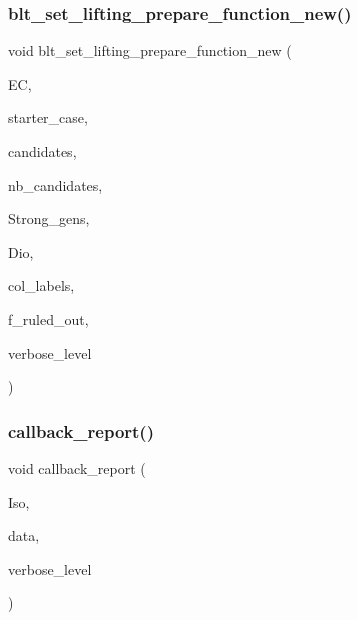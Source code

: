 \subsubsection{\texorpdfstring{blt\+\_\+set\+\_\+lifting\+\_\+prepare\+\_\+function\+\_\+new()}{blt\_set\_lifting\_prepare\_function\_new()}}
{\footnotesize\ttfamily void blt\+\_\+set\+\_\+lifting\+\_\+prepare\+\_\+function\+\_\+new (\begin{DoxyParamCaption}\item[{\mbox{\hyperlink{classexact__cover}{exact\+\_\+cover}} $\ast$}]{EC,  }\item[{\mbox{\hyperlink{galois_8h_a09fddde158a3a20bd2dcadb609de11dc}{I\+NT}}}]{starter\+\_\+case,  }\item[{\mbox{\hyperlink{galois_8h_a09fddde158a3a20bd2dcadb609de11dc}{I\+NT}} $\ast$}]{candidates,  }\item[{\mbox{\hyperlink{galois_8h_a09fddde158a3a20bd2dcadb609de11dc}{I\+NT}}}]{nb\+\_\+candidates,  }\item[{\mbox{\hyperlink{classstrong__generators}{strong\+\_\+generators}} $\ast$}]{Strong\+\_\+gens,  }\item[{\mbox{\hyperlink{classdiophant}{diophant}} $\ast$\&}]{Dio,  }\item[{\mbox{\hyperlink{galois_8h_a09fddde158a3a20bd2dcadb609de11dc}{I\+NT}} $\ast$\&}]{col\+\_\+labels,  }\item[{\mbox{\hyperlink{galois_8h_a09fddde158a3a20bd2dcadb609de11dc}{I\+NT}} \&}]{f\+\_\+ruled\+\_\+out,  }\item[{\mbox{\hyperlink{galois_8h_a09fddde158a3a20bd2dcadb609de11dc}{I\+NT}}}]{verbose\+\_\+level }\end{DoxyParamCaption})}

\mbox{\label{blt__set2_8_c_a7140a517d83eba77c8fdc1ba0bd2dab4}} 
\subsubsection{\texorpdfstring{callback\+\_\+report()}{callback\_report()}}
{\footnotesize\ttfamily void callback\+\_\+report (\begin{DoxyParamCaption}\item[{\mbox{\hyperlink{classisomorph}{isomorph}} $\ast$}]{Iso,  }\item[{void $\ast$}]{data,  }\item[{\mbox{\hyperlink{galois_8h_a09fddde158a3a20bd2dcadb609de11dc}{I\+NT}}}]{verbose\+\_\+level }\end{DoxyParamCaption})}

